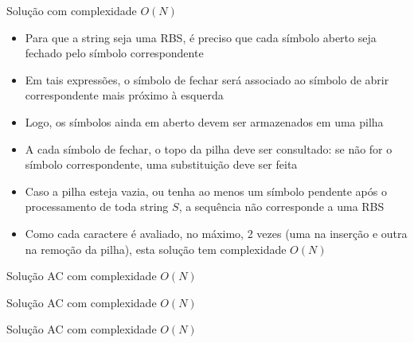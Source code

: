 \begin{frame}[fragile]{Solução com complexidade $O(N)$}

    \begin{itemize}
        \item Para que a string seja uma RBS, é preciso que cada símbolo aberto seja fechado
            pelo símbolo correspondente

        \item Em tais expressões, o símbolo de fechar será associado ao símbolo de abrir 
            correspondente mais próximo à esquerda

        \item Logo, os símbolos ainda em aberto devem ser armazenados em uma pilha

        \item A cada símbolo de fechar, o topo da pilha deve ser consultado: se não for o símbolo
            correspondente, uma substituição deve ser feita

        \item Caso a pilha esteja vazia, ou tenha ao menos um símbolo pendente após o processamento
            de toda string $S$, a sequência não corresponde a uma RBS

        \item Como cada caractere é avaliado, no máximo, 2 vezes (uma na inserção e outra na 
            remoção da pilha), esta solução tem complexidade $O(N)$
   \end{itemize}

\end{frame}

\begin{frame}[fragile]{Solução AC com complexidade $O(N)$}
\end{frame}

\begin{frame}[fragile]{Solução AC com complexidade $O(N)$}
\end{frame}

\begin{frame}[fragile]{Solução AC com complexidade $O(N)$}
\end{frame}
